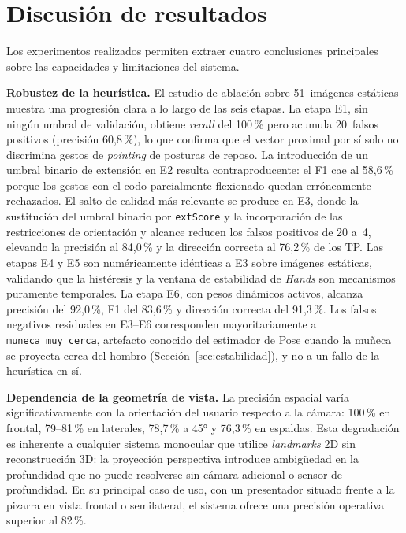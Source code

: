 \documentclass[12pt]{report} %
\begin{document}
\section{Discusión de resultados}
\label{sec:eval_discusion}

Los experimentos realizados permiten extraer cuatro conclusiones principales sobre las capacidades y limitaciones del sistema.

\textbf{Robustez de la heurística.} El estudio de ablación sobre 51~imágenes estáticas muestra una progresión clara a lo largo de las seis etapas. La etapa E1, sin ningún umbral de validación, obtiene \textit{recall} del 100\,\% pero acumula 20~falsos positivos (precisión 60{,}8\,\%), lo que confirma que el vector proximal por sí solo no discrimina gestos de \textit{pointing} de posturas de reposo. La introducción de un umbral binario de extensión en E2 resulta contraproducente: el F1 cae al 58{,}6\,\% porque los gestos con el codo parcialmente flexionado quedan erróneamente rechazados. El salto de calidad más relevante se produce en E3, donde la sustitución del umbral binario por \texttt{extScore} y la incorporación de las restricciones de orientación y alcance reducen los falsos positivos de 20 a~4, elevando la precisión al 84{,}0\,\% y la dirección correcta al 76{,}2\,\% de los TP. Las etapas E4 y E5 son numéricamente idénticas a E3 sobre imágenes estáticas, validando que la histéresis y la ventana de estabilidad de \textit{Hands} son mecanismos puramente temporales. La etapa E6, con pesos dinámicos activos, alcanza precisión del 92{,}0\,\%, F1 del 83{,}6\,\% y dirección correcta del 91{,}3\,\%. Los falsos negativos residuales en E3--E6 corresponden mayoritariamente a \texttt{muneca\_muy\_cerca}, artefacto conocido del estimador de Pose cuando la muñeca se proyecta cerca del hombro (Sección~\ref{sec:estabilidad}), y no a un fallo de la heurística en sí.

\textbf{Dependencia de la geometría de vista.} La precisión espacial varía significativamente con la orientación del usuario respecto a la cámara: 100\,\% en frontal, 79--81\,\% en laterales, 78{,}7\,\% a 45° y 76{,}3\,\% en espaldas. Esta degradación es inherente a cualquier sistema monocular que utilice \textit{landmarks} 2D sin reconstrucción 3D: la proyección perspectiva introduce ambigüedad en la profundidad que no puede resolverse sin cámara adicional o sensor de profundidad. En su principal caso de uso, con un presentador situado frente a la pizarra en vista frontal o semilateral, el sistema ofrece una precisión operativa superior al 82\,\%.
\end{document}
